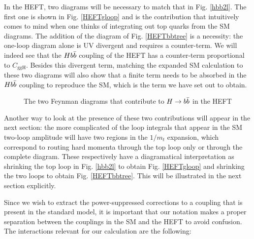 In the HEFT, two diagrams will be necessary to match that in Fig. \ref{hbb2l}. The first one is shown in Fig. \ref{HEFTgloop} and is the contribution that intuitively comes to mind when one thinks of integrating out top quarks from the SM diagrams.
The addition of the diagram of Fig. \ref{HEFTbbtree} is a necessity: the one-loop diagram alone is UV divergent and requires a counter-term.
We will indeed see that the $Hb \bar b$ coupling of the HEFT has a counter-term proportional to $C_{\text{ggH}}$.
Besides this divergent term, matching the expanded SM calculation to these two diagrams will also show that a finite term needs to be absorbed in the $Hb \bar b$ coupling to reproduce the SM, which is the term we have set out to obtain.

\begin{figure}[!h]
  \centering
  \hspace{5em}
  \hspace{2em}
  \caption[$H\to\bbbar$ in the HEFT]{The two Feynman diagrams that contribute to $H\to \bbbar$ in the HEFT}
  \label{HEFThbbdiags}
\end{figure}

Another way to look at the presence of these two contributions will appear in the next section: the more complicated of the loop integrals that appear in the SM two-loop amplitude will have two regions in the $1/m_t$ expansion, which correspond to routing hard momenta through the top loop only or through the complete diagram.
These respectively have a diagramatical interpretation as shrinking the top loop in Fig. \ref{hbb2l} to obtain Fig. \ref{HEFTgloop} and shrinking the two loops to obtain Fig. \ref{HEFTbbtree}. This will be illustrated in the next section explicitly.

Since we wish to extract the power-suppressed corrections to a coupling that is present in the standard model, it is important that our notation makes a proper separation between the couplings in the SM and the HEFT to avoid confusion.
The interactions relevant for our calculation are the following:

